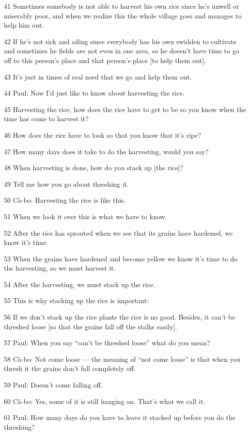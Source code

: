 41 Sometimes somebody is not able to harvest his own rice since he's unwell or
miserably poor, and when we realize this the whole village goes and manages to
help him out.

42 If he's not sick and ailing since everybody has his own swidden to cultivate
and sometimes he fields are not even in one area, so he doesn't have time to go
off to this person's place and that person's place [to help them out].

43 It's just in times of real need that we go and help them out.

44 Paul: Now I'd just like to know about harvesting the rice.

45 Harvesting the rice, how does the rice have to get to be so you know when the
time has come to harvest it?

46 How does the rice have to look so that you know that it's ripe?

47 How many days does it take to do the harvesting, would you say?

48 When harvesting is done, how do you stack up [the rice]?

49 Tell me how you go about threshing it.

50 Cà-bo: Harvesting the rice is like this.

51 When we look it over this is what we have to know.

52 After the rice has sprouted when we see that its grains have hardened, we know
it's time.

53 When the grains have hardened and become yellow we know it's time to do the
harvesting, so we must harvest it.

54 After the harvesting, we must stack up the rice.

55 This is why stacking up the rice is important:

56 If we don't stack up the rice plants the rice is no good. Besides, it can't
be threshed loose [so that the grains fall off the stalks easily].

57 Paul: When you say ``can't be threshed loose'' what do you mean?

58 Cà-bo: Not come loose --- the meaning of ``not come loose'' is that when you
thresh it the grains don't fall completely off.

59 Paul: Doesn't come falling off.

60 Cà-bo: Yes, some of it is still hanging on. That's what we call it.

61 Paul: How many days do you have to leave it stacked up before you do the threshing?

